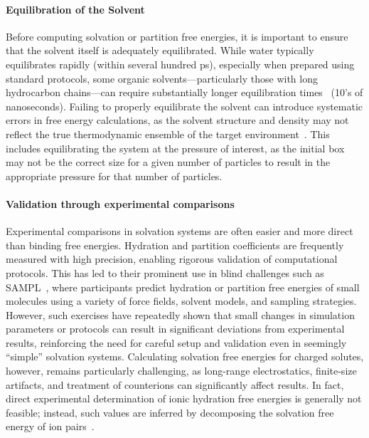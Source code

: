 \documentclass[9pt,bestpractices]{livecoms}
\begin{document}
\paragraph{Equilibration of the Solvent}
Before computing solvation or partition free energies, it is important to ensure that the solvent itself is adequately equilibrated. While water typically equilibrates rapidly (within several hundred ps), especially when prepared using standard protocols, some organic solvents—particularly those with long hydrocarbon chains—can require substantially longer equilibration times~\cite{fan2021sampl7} (10's of nanoseconds). Failing to properly equilibrate the solvent can introduce systematic errors in free energy calculations, as the solvent structure and density may not reflect the true thermodynamic ensemble of the target environment~\cite{zhang2017solventmodel}. This includes equilibrating the system at the pressure of interest, as the initial box may not be the correct size for a given number of particles to result in the appropriate pressure for that number of particles. 

\paragraph{Validation through experimental comparisons}  
Experimental comparisons in solvation systems are often easier and more direct than binding free energies. Hydration and partition coefficients are frequently measured with high precision, enabling rigorous validation of computational protocols. This has led to their prominent use in blind challenges such as SAMPL~\cite{skillman2012sampl3, mobley2014sampl4, bergazin2021sampl7}, where participants predict hydration or partition free energies of small molecules using a variety of force fields, solvent models, and sampling strategies. However, such exercises have repeatedly shown that small changes in simulation parameters or protocols can result in significant deviations from experimental results, reinforcing the need for careful setup and validation even in seemingly ``simple'' solvation systems.  Calculating solvation free energies for charged solutes, however, remains particularly challenging, as long-range electrostatics, finite-size artifacts, and treatment of counterions can significantly affect results. In fact, direct experimental determination of ionic hydration free energies is generally not feasible; instead, such values are inferred by decomposing the solvation free energy of ion pairs~\cite{mobley2014freesolv}. 
\end{document}
